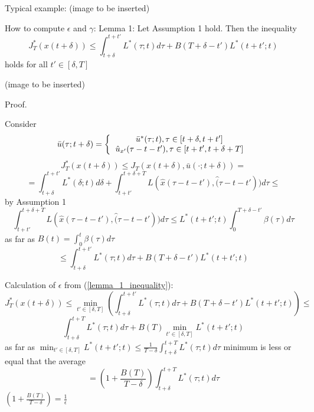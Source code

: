 Typical example: (image to be inserted)

How to compute $\epsilon$ and $\gamma$:
Lemma 1: Let Assumption 1 hold. Then the inequality 
\begin{equation}\label{lemma_1_inequality}
J_T^*(x(t+\delta)) \leq \int_{t+\delta}^{t+t'}L^*(\tau;t)d\tau + B(T+\delta - t')L^*(t+t';t)
\end{equation}
holds for all $t' \in [\delta,T]$

(image to be inserted)

Proof.

Consider 
\begin{equation*}
\bar u(\tau;t+\delta) = \left \{
  \begin{tabular}{c}
  $\bar u^*(\tau;t), \tau \in [t+\delta, t+t']$ \\
  $\hat u_{x'}(\tau - t - t'), \tau \in [t+t', t+\delta + T]$
  \end{tabular}
\right.
\end{equation*}
\begin{equation*}
J^*_T(x(t+\delta)) \leq J_T(x(t+\delta), \bar u(\cdot;t+\delta)) =
\end{equation*}
\begin{equation*}
=\int^{t+t'}_{t+\delta}L^*(\delta;t)d\delta + \int_{t+t'}^{t+\delta+T}L(\hat x(\tau - t - t'), \hat (\tau - t - t'))d\tau \leq
\end{equation*} 
by Assumption 1
\begin{equation*}
\int_{t+t'}^{t+\delta+T}L(\hat x(\tau - t - t'), \hat (\tau - t - t'))d\tau \leq L^*(t+t';t) \int_0^{T+\delta-t'}\beta(\tau)d\tau
\end{equation*}
as far as $B(t) = \int_0^t\beta(\tau)d\tau$
\begin{equation*}
\leq \int_{t+\delta}^{t+t'}L^*(\tau;t)d\tau + B(T+\delta-t')L^*(t+t';t)
\end{equation*}

Calculation of $\epsilon$ from (\ref{lemma_1_inequality}):
\begin{equation*}
J^*_T(x(t+\delta)) \leq \min_{t' \in [\delta,T]}(\int_{t+\delta}^{t+t'}L^*(\tau;t)d\tau + B(T+\delta-t')L^*(t+t';t)) \leq
\end{equation*}
\begin{equation*}
\int_{t+\delta}^{t+T}L^*(\tau;t)d\tau + B(T) \min_{t'\in[\delta,T]}L^*(t+t';t)
\end{equation*}
as far as 
$\min_{t'\in[\delta,T]}L^*(t+t';t) \leq \frac{1}{T-\delta}\int_{t+\delta}^{t+T}L^*(\tau;t)d\tau$
minimum is less or equal that the average
\begin{equation*}
=(1+\frac{B(T)}{T-\delta})\int_{t+\delta}^{t+T}L^*(\tau;t)d\tau
\end{equation*}
$(1+\frac{B(T)}{T-\delta}) = \frac{1}{\epsilon}$

